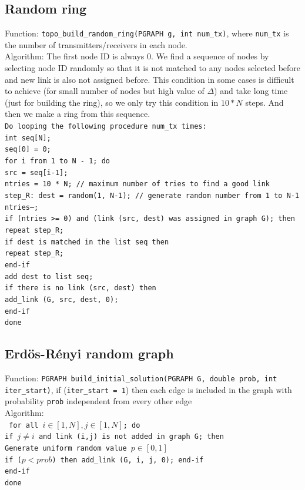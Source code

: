 \documentclass[a4paper]{article}
\begin{document}
  \subsection{Random ring}
  Function: \texttt{topo\_build\_random\_ring(PGRAPH g, int num\_tx)}, where \texttt{num\_tx} is the number of transmitters/receivers in each node.\\
  Algorithm: The first node ID is always 0. We find a sequence of nodes by selecting node ID randomly so that it is not matched to any nodes selected before and new link is also not assigned before. This condition in some cases is difficult to achieve (for small number of nodes but high value of $\Delta$) and take long time (just for building the ring), so we only try this condition in $10*N$ steps. And then we make a ring from this sequence.\\
  \texttt{Do looping the following procedure num\_tx times:\\
  int seq[N]; \\
  seq[0] = 0; \\
  for i from 1 to N - 1; do \\
  \indent src = seq[i-1]; \\
  \indent ntries = 10 * N; // maximum number of tries to find a good link \\ 
  \indent step\_R: dest = random(1, N-1); // generate random number from 1 to N-1 \\
  \indent ntries--;\\
  \indent if (ntries >= 0) and (link (src, dest) was assigned in graph G); then \\
  \indent\indent repeat step\_R;\\
  \indent if dest is matched in the list seq then \\
  \indent\indent  repeat step\_R; \\
  \indent end-if\\
  \indent add dest to list seq; \\
  \indent if there is no link (src, dest) then \\
  \indent\indent  add\_link (G, src, dest, 0); \\
  \indent end-if\\
  done}
  \subsection{Erd\"{o}s-R\'{e}nyi random graph}
  Function: \texttt{PGRAPH build\_initial\_solution(PGRAPH G, double prob, int iter\_start)}, if (\texttt{iter\_start = 1}) then each edge is included in the graph with probability \texttt{prob} independent from every other edge\\
  Algorithm: \\
  \texttt{
  for all $i \in [1,N], j \in [1,N]$; do\\
  \indent if $j \neq i$ and link (i,j) is not added in graph G; then \\
  \indent\indent Generate uniform random value $p \in [0,1]$\\
  \indent\indent if ($p < prob$) then add\_link (G, i, j, 0); end-if\\
  \indent end-if\\
  done}
\end{document}
